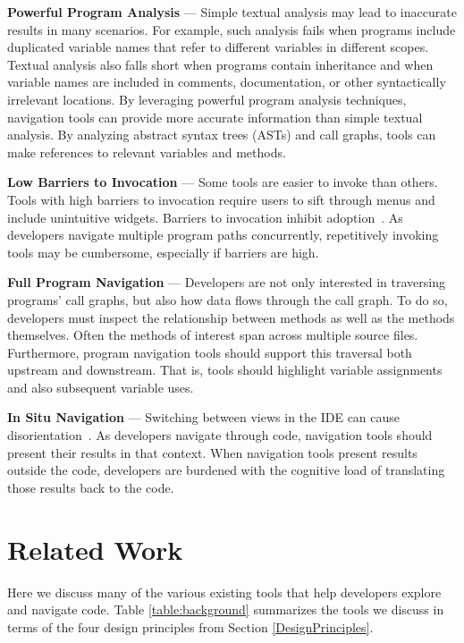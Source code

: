 \documentclass[conference]{IEEEtran}
\begin{document}
\vspace{1em} 
\noindent\textbf{Powerful Program Analysis} ---
Simple textual analysis may lead to inaccurate results in many scenarios. For example, such analysis fails when programs include duplicated variable names that refer to different variables in different scopes. Textual analysis also falls short when programs contain inheritance and when variable names are included in comments, documentation, or other syntactically irrelevant locations.
By leveraging powerful program analysis techniques, navigation tools can provide more accurate information than simple textual analysis.
By analyzing abstract syntax trees (ASTs) and call graphs, tools can make references to relevant variables and methods. 

\vspace{1em} 
\noindent\textbf{Low Barriers to Invocation} ---
Some tools are easier to invoke than others. 
Tools with high barriers to invocation require users to sift through menus and include unintuitive widgets. 
Barriers to invocation inhibit adoption~\cite{johnson2013don}.
As developers navigate multiple program paths concurrently, repetitively invoking tools may be cumbersome, especially if barriers are high. 


\vspace{1em} 
\noindent\textbf{Full Program Navigation}  ---
Developers are not only interested in traversing programs' call graphs, but also how data flows through the call graph.
To do so, developers must inspect the relationship between methods as well as the methods themselves.
Often the methods of interest span across multiple source files.
Furthermore, program navigation tools should support this traversal both upstream and downstream. 
That is, tools should highlight variable assignments and also subsequent variable uses. 

\vspace{1em} 
\noindent\textbf{In Situ Navigation}  ---
Switching between views in the IDE can cause disorientation~\cite{deAlwis2006disorient}. As developers navigate through code, navigation tools should present their results in that context. 
When navigation tools present results outside the code, developers are burdened with the cognitive load of translating those results back to the code.

\section{Related Work}
Here we discuss many of the various existing tools that help developers explore and navigate code. Table \ref{table:background} summarizes the tools we discuss in terms of the four design principles from Section \ref{DesignPrinciples}.
\end{document}

